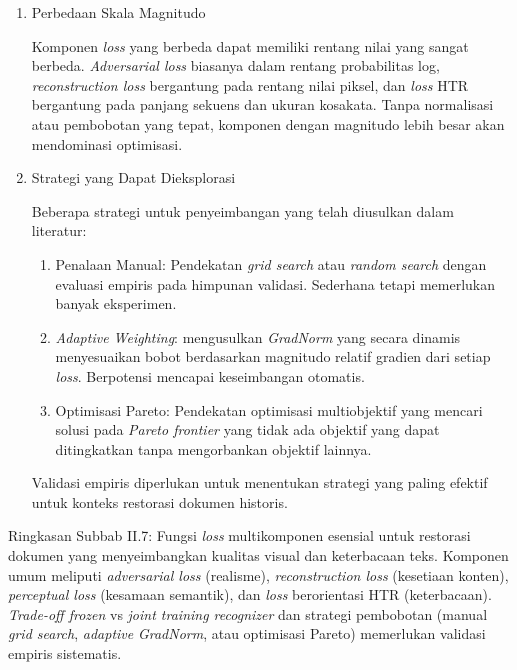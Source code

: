 \documentclass[12pt,a4paper]{article}
\begin{document}
\begin{enumerate}[leftmargin=*, labelindent=0pt, itemsep=1ex, topsep=0pt]

\item Perbedaan Skala Magnitudo
\label{para:perbedaan-skala-magnitudo}

Komponen \textit{loss} yang berbeda dapat memiliki rentang nilai yang sangat berbeda. \textit{Adversarial loss} biasanya dalam rentang probabilitas log, \textit{reconstruction loss} bergantung pada rentang nilai piksel, dan \textit{loss} HTR bergantung pada panjang sekuens dan ukuran kosakata. Tanpa normalisasi atau pembobotan yang tepat, komponen dengan magnitudo lebih besar akan mendominasi optimisasi.

\item Strategi yang Dapat Dieksplorasi
\label{para:strategi-pembobotan}

Beberapa strategi untuk penyeimbangan yang telah diusulkan dalam literatur:

\begin{enumerate}[leftmargin=1.5em, labelsep=0.5em, itemindent=0pt, label=\alph*., topsep=0pt, parsep=0pt, itemsep=0pt]
      \item Penalaan Manual: \mbox{} Pendekatan \textit{grid search} atau \textit{random search} dengan evaluasi empiris pada himpunan validasi. Sederhana tetapi memerlukan banyak eksperimen.

      \item \textit{Adaptive Weighting}: \mbox{} \parencite{chen2018gradnorm} mengusulkan \textit{GradNorm} yang secara dinamis menyesuaikan bobot berdasarkan magnitudo relatif gradien dari setiap \textit{loss}. Berpotensi mencapai keseimbangan otomatis.

      \item Optimisasi Pareto: \mbox{} Pendekatan optimisasi multiobjektif yang mencari solusi pada \textit{Pareto frontier} yang tidak ada objektif yang dapat ditingkatkan tanpa mengorbankan objektif lainnya.
\end{enumerate}

Validasi empiris diperlukan untuk menentukan strategi yang paling efektif untuk konteks restorasi dokumen historis.

\end{enumerate}

Ringkasan Subbab II.7: Fungsi \textit{loss} multikomponen esensial untuk restorasi dokumen yang menyeimbangkan kualitas visual dan keterbacaan teks. Komponen umum meliputi \textit{adversarial loss} (realisme), \textit{reconstruction loss} (kesetiaan konten), \textit{perceptual loss} (kesamaan semantik), dan \textit{loss} berorientasi HTR (keterbacaan). \textit{Trade-off frozen} vs \textit{joint training recognizer} dan strategi pembobotan (manual \textit{grid search}, \textit{adaptive} \textit{GradNorm}, atau optimisasi Pareto) memerlukan validasi empiris sistematis.
\end{document}
